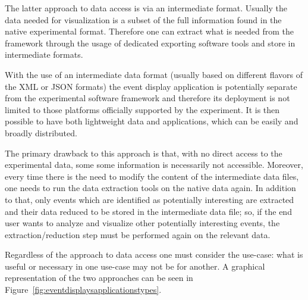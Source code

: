 \documentclass[12pt,a4paper]{article}
\begin{document}
The latter approach to data access is via an intermediate format. Usually the data needed for visualization is a subset of the
full information found in the native experimental format. Therefore one can extract what is needed from the framework through
the usage of dedicated exporting software tools and store in intermediate formats.

With the use of an intermediate data format (usually based on different flavors of the XML or JSON formats) the event display
application is potentially separate from the experimental software framework and therefore its deployment is not limited to
those platforms officially supported by the experiment. It is then possible to have both lightweight data and applications,
which can be easily and broadly distributed. %

The primary drawback to this approach is that, with no direct access to the experimental data, some
some information is necessarily not accessible. Moreover, every time there is the need to modify the content of the
intermediate data files, one needs to run the data extraction tools on the native data again.
In addition to that, only events which are identified as potentially interesting are extracted and their
data reduced to be stored in the intermediate data file; so, if the end user wants to analyze and visualize other
potentially interesting events, the extraction/reduction step must be performed again on the relevant data.

Regardless of the approach to data access one must consider the use-case: what is useful or necessary
in one use-case may not be for another. A graphical representation of the two approaches can be
seen in Figure~\ref{fig:eventdisplaysapplicationstypes}.
\end{document}
